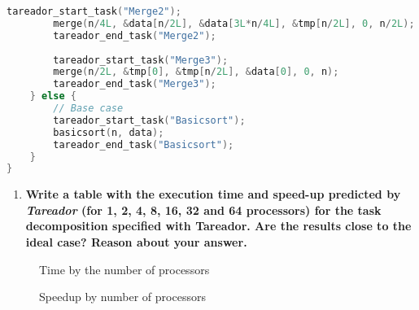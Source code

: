 \documentclass[a4paper]{article}
\newenvironment{questionenum}{%
\setlist[enumerate]{resume}
\restartlist{enumerate}
\newcommand{\question}[1]{
\begin{enumerate}
	\item\bfseries ##1
\end{enumerate}
}}{%
}
\begin{document}
\begin{questionenum}
\begin{lstlisting}[language=C]
		tareador_start_task("Merge2");
		merge(n/4L, &data[n/2L], &data[3L*n/4L], &tmp[n/2L], 0, n/2L);
		tareador_end_task("Merge2");
		
		tareador_start_task("Merge3");
		merge(n/2L, &tmp[0], &tmp[n/2L], &data[0], 0, n);
		tareador_end_task("Merge3");
	} else {
		// Base case
		tareador_start_task("Basicsort");
		basicsort(n, data);
		tareador_end_task("Basicsort");
	}
}
\end{lstlisting}
	
	\question{Write a table with the execution time and speed-up predicted by \textit{Tareador} (for 1, 2, 4, 8, 16, 32 and 64 processors) for the task decomposition specified with Tareador. Are the results close to the ideal case? Reason about your answer.}
	
	\begin{figure}[H]
		\centering
		\begin{minipage}[t]{0.45\textwidth}
			\caption{Time by the number of processors}
		\end{minipage}
		\hfill
		\begin{minipage}[t]{0.45\textwidth}
			\caption{Speedup by number of processors}
		\end{minipage}
	\end{figure}
\end{questionenum}
\end{document}
